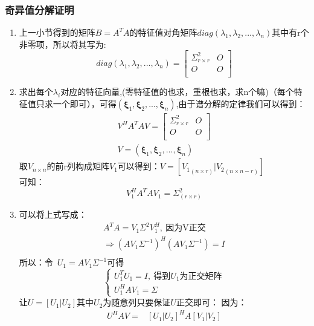 \documentclass[12pt]{article}
\begin{document}
\begin{CJK*}{UTF8}{gbsn}
\subsubsection{奇异值分解证明}
\begin{enumerate}
	\item 上一小节得到的矩阵$B=A^TA$的特征值对角矩阵$diag(\lambda_1,\lambda_2,...,\lambda_n)$其中有r个非零项，所以将其写为:
	\begin{equation}
		diag(\lambda_1,\lambda_2,...,\lambda_n)=\begin{bmatrix}
	\Sigma^2_{r\times r} &O  \\
	O&  O\\
\end{bmatrix}
	\end{equation}
	\item 求出每个$\lambda_i$对应的特征向量,(零特征值的也求，重根也求，求n个嘛)（每个特征值只求一个即可），可得$(\bm\xi_1,\bm\xi_2,...,\bm\xi_n)$,由于谱分解的定律我们可以得到：
	\begin{eqnarray*}
		V^HA^TAV=\begin{bmatrix}
	\Sigma^2_{r\times r} &O  \\
	O&  O\\
\end{bmatrix}\\
V=(\bm\xi_1,\bm\xi_2,...,\bm\xi_n)
	\end{eqnarray*}
	取$V_{n\times n}$的前r列构成矩阵$V_1$可以得到：$V=[{V_1}_{(n\times r)}|{V_2}_{(n\times n-r)}]$\\
	可知：\begin{equation}
		V_1^HA^TAV_1=\Sigma^2_{(r\times r)}
	\end{equation}
	\item 可以将上式写成：\begin{align*}
		A^TA=V_1\Sigma^2V_1^H,~\mbox{因为V正交}\\
		\Rightarrow (AV_1\Sigma^{-1})^H(AV_1\Sigma^{-1})=I\\
	\end{align*}
	所以：令~$U_1=AV_1\Sigma^{-1}$可得
	\begin{equation}
		\begin{cases}
			U_1^TU_1=I,~\mbox{得到$U_1$为正交矩阵}\\
			U_1^HAV_1=\Sigma
		\end{cases}
	\end{equation}
	让$U=[U_1|U_2]$其中$U_2$为随意列只要保证$U$正交即可：
	因为：
	\begin{align*}
		U^HAV=&[U_1|U_2]^HA[V_1|V_2]\\

\end{align*}
\end{enumerate}
\end{CJK*}
\end{document}
